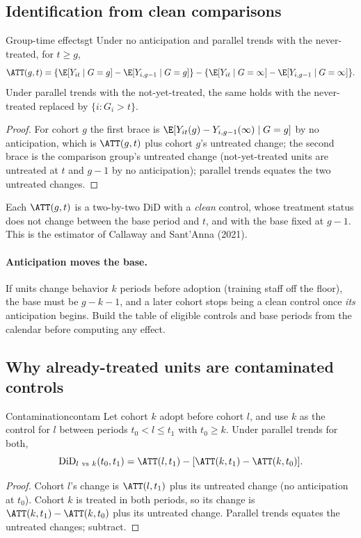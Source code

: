 \documentclass[11pt]{article}
\begin{document}
\subsection{Identification from clean comparisons}

\begin{prop}{Group-time effects}{gt}
Under no anticipation and parallel trends with the never-treated, for $t \ge g$,
\[
  \ATT(g, t) = \{\E[Y_{it} \mid G=g] - \E[Y_{i,g-1} \mid G=g]\} - \{\E[Y_{it} \mid G=\infty] - \E[Y_{i,g-1} \mid G=\infty]\}.
\]
Under parallel trends with the not-yet-treated, the same holds with the never-treated replaced by $\{i : G_i > t\}$.
\end{prop}
\begin{proof}
For cohort $g$ the first brace is $\E[Y_{it}(g) - Y_{i,g-1}(\infty) \mid G=g]$ by no anticipation, which is $\ATT(g,t)$ plus cohort $g$'s untreated change; the
second brace is the comparison group's untreated change (not-yet-treated units are untreated at $t$ and $g - 1$ by no anticipation); parallel trends
equates the two untreated changes.
\end{proof}

Each $\ATT(g,t)$ is a two-by-two DiD with a \emph{clean} control, whose treatment status does not change between the base period and $t$, and with the
base fixed at $g - 1$. This is the estimator of Callaway and Sant'Anna (2021).

\paragraph{Anticipation moves the base.} If units change behavior $k$ periods before adoption (training staff off the floor), the base must be $g - k - 1$,
and a later cohort stops being a clean control once \emph{its} anticipation begins. Build the table of eligible controls and base periods from the calendar
before computing any effect.

\subsection{Why already-treated units are contaminated controls}

\begin{prop}{Contamination}{contam}
Let cohort $k$ adopt before cohort $l$, and use $k$ as the control for $l$ between periods $t_0 < l \le t_1$ with $t_0 \ge k$. Under parallel trends for both,
\[
  \text{DiD}_{l\ \text{vs}\ k}(t_0, t_1) = \ATT(l, t_1) - [\ATT(k, t_1) - \ATT(k, t_0)].
\]
\end{prop}
\begin{proof}
Cohort $l$'s change is $\ATT(l, t_1)$ plus its untreated change (no anticipation at $t_0$). Cohort $k$ is treated in both periods, so its change is
$\ATT(k,t_1) - \ATT(k,t_0)$ plus its untreated change. Parallel trends equates the untreated changes; subtract.
\end{proof}
\end{document}
